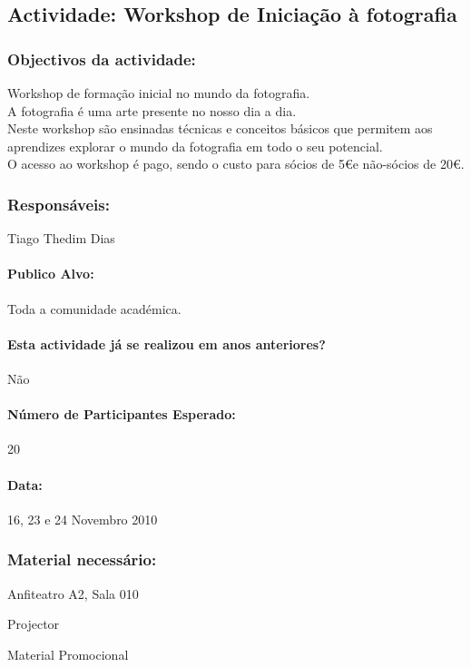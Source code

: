 \subsection{Actividade: Workshop de Iniciação à fotografia} 

\subsubsection*{Objectivos da actividade:}
\indent Workshop de formação inicial no mundo da fotografia.\\
\indent A fotografia é uma arte presente no nosso dia a dia.\\
\indent Neste workshop são ensinadas técnicas e conceitos básicos que permitem aos aprendizes explorar o mundo da fotografia em todo o seu potencial.\\
\indent O acesso ao workshop é pago, sendo o custo para sócios de 5\euro e não-sócios de 20\euro.
\subsubsection*{Responsáveis:}
\begin{itemizedash}
	\item{Tiago Thedim Dias}
\end{itemizedash}

\paragraph{Publico Alvo: }
Toda a comunidade académica.

\paragraph{Esta actividade já se realizou em anos anteriores?}
Não

\paragraph{Número de Participantes Esperado:}
20

\paragraph{Data:} 16, 23 e 24 Novembro 2010

\subsubsection*{Material necessário:}
\begin{itemizedash}
	\item{Anfiteatro A2, Sala 010}
	\item{Projector}
	\item{Material Promocional}
\end{itemizedash}

